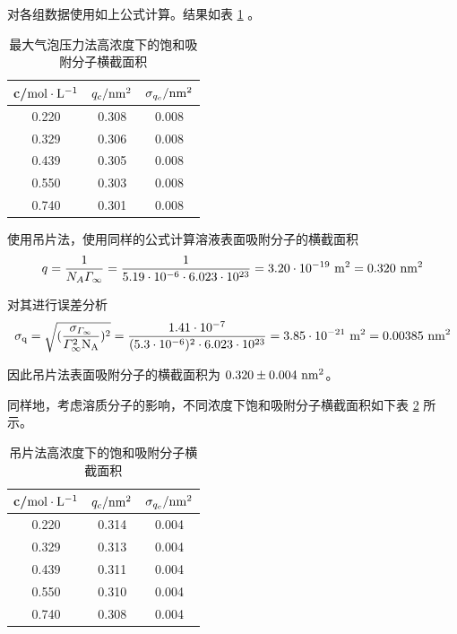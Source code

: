 \documentclass[cn,hazy,pku,12pt,normal,math=newtx,cite=super]{elegantnote}
\begin{document}
对各组数据使用如上公式计算。结果如表 \ref{9} 。
\begin{table}[h]
    \centering
    \caption{最大气泡压力法高浓度下的饱和吸附分子横截面积}
    \label{9}
    \begin{tabular}{ccc}
    \hline
    c/$\rm   mol \cdot L^{-1}$ & $q_c/{\rm nm^2}$ & $\sigma_{q_c}/{ \rm nm^2}$ \\ \hline
    0.220                      & 0.308 & 0.008    \\
    0.329                      & 0.306 & 0.008    \\
    0.439                      & 0.305 & 0.008    \\
    0.550                      & 0.303 & 0.008    \\
    0.740                      & 0.301 & 0.008    \\ \hline
    \end{tabular}
\end{table}


使用吊片法，使用同样的公式计算溶液表面吸附分子的横截面积
$$
   q = \frac{1}{N_A \varGamma_\infty} = \frac{1}{5.19 \cdot 10^{-6} \cdot  6.023 \cdot 10^{23}} = 3.20 \cdot 10^{-19}{\rm\ m^2} = 0.320{\rm\ nm^2}
$$

对其进行误差分析
$$
\rm \sigma_{q} = \sqrt{(\frac{\sigma_{\varGamma_\infty}}{\varGamma_\infty^2 N_A} )^2} = \frac{1.41 \cdot 10^{-7} }{(5.3 \cdot 10^{-6})^2 \cdot  6.023 \cdot 10^{23}} = 3.85 \cdot 10^{-21}\ m^2 = 0.00385\ nm^2
$$

因此吊片法表面吸附分子的横截面积为 $0.320 \pm 0.004 {\rm\ nm^{2}}$。

同样地，考虑溶质分子的影响，不同浓度下饱和吸附分子横截面积如下表 \ref{10} 所示。
\begin{table}[h]
    \centering
    \caption{吊片法高浓度下的饱和吸附分子横截面积}
    \label{10}
    \begin{tabular}{ccc}
    \hline
    c/$\rm   mol \cdot L^{-1}$ & $q_c/{\rm nm^2}$ & $\sigma_{q_c}/{\rm nm^2}$ \\ \hline
    0.220                      & 0.314 & 0.004          \\
    0.329                      & 0.313 & 0.004          \\
    0.439                      & 0.311 & 0.004          \\
    0.550                      & 0.310 & 0.004          \\
    0.740                      & 0.308 & 0.004          \\ \hline
    \end{tabular}
\end{table}
\end{document}
